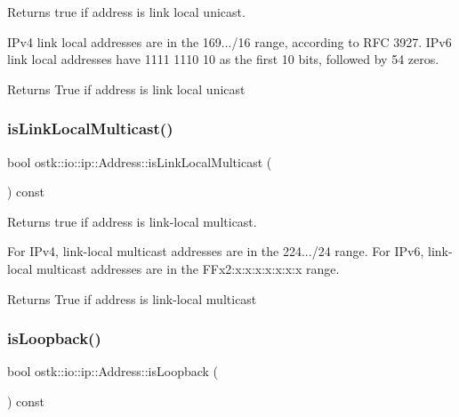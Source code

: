 Returns true if address is link local unicast. 

I\+Pv4 link local addresses are in the 169.../16 range, according to R\+FC 3927. I\+Pv6 link local addresses have 1111 1110 10 as the first 10 bits, followed by 54 zeros.

\begin{DoxyReturn}{Returns}
True if address is link local unicast 
\end{DoxyReturn}
\mbox{\label{classostk_1_1io_1_1ip_1_1_address_a90befc1694794a5608eb307715056d2d}} 
\subsubsection{\texorpdfstring{is\+Link\+Local\+Multicast()}{isLinkLocalMulticast()}}
{\footnotesize\ttfamily bool ostk\+::io\+::ip\+::\+Address\+::is\+Link\+Local\+Multicast (\begin{DoxyParamCaption}{ }\end{DoxyParamCaption}) const}



Returns true if address is link-\/local multicast. 

For I\+Pv4, link-\/local multicast addresses are in the 224.../24 range. For I\+Pv6, link-\/local multicast addresses are in the F\+Fx2\+:x\+:x\+:x\+:x\+:x\+:x\+:x range.

\begin{DoxyReturn}{Returns}
True if address is link-\/local multicast 
\end{DoxyReturn}
\mbox{\label{classostk_1_1io_1_1ip_1_1_address_aed5c82ceb025f23bcf17b5a76f1c4758}} 
\subsubsection{\texorpdfstring{is\+Loopback()}{isLoopback()}}
{\footnotesize\ttfamily bool ostk\+::io\+::ip\+::\+Address\+::is\+Loopback (\begin{DoxyParamCaption}{ }\end{DoxyParamCaption}) const}



